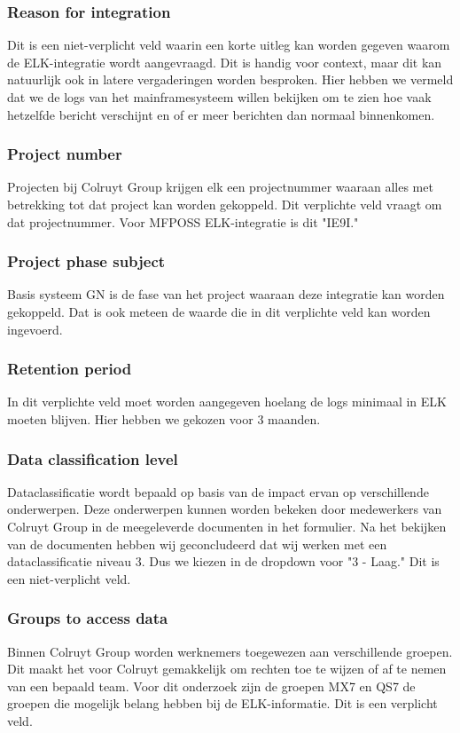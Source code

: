 \subsubsection{Reason for integration}
Dit is een niet-verplicht veld waarin een korte uitleg kan worden gegeven waarom de ELK-integratie wordt aangevraagd. Dit is handig voor context, maar dit kan natuurlijk ook in latere vergaderingen worden besproken. Hier hebben we vermeld dat we de logs van het mainframesysteem willen bekijken om te zien hoe vaak hetzelfde bericht verschijnt en of er meer berichten dan normaal binnenkomen.

\subsubsection{Project number}
Projecten bij Colruyt Group krijgen elk een projectnummer waaraan alles met betrekking tot dat project kan worden gekoppeld. Dit verplichte veld vraagt om dat projectnummer. Voor MFPOSS ELK-integratie is dit "IE9I."

\subsubsection{Project phase subject}
Basis systeem GN is de fase van het project waaraan deze integratie kan worden gekoppeld. Dat is ook meteen de waarde die in dit verplichte veld kan worden ingevoerd.

\subsubsection{Retention period}
In dit verplichte veld moet worden aangegeven hoelang de logs minimaal in ELK moeten blijven. Hier hebben we gekozen voor 3 maanden.

\subsubsection{Data classification level}
Dataclassificatie wordt bepaald op basis van de impact ervan op verschillende onderwerpen. Deze onderwerpen kunnen worden bekeken door medewerkers van Colruyt Group in de meegeleverde documenten in het formulier. Na het bekijken van de documenten hebben wij geconcludeerd dat wij werken met een dataclassificatie niveau 3. Dus we kiezen in de dropdown voor "3 - Laag." Dit is een niet-verplicht veld.

\subsubsection{Groups to access data}
Binnen Colruyt Group worden werknemers toegewezen aan verschillende groepen. Dit maakt het voor Colruyt gemakkelijk om rechten toe te wijzen of af te nemen van een bepaald team. Voor dit onderzoek zijn de groepen MX7 en QS7 de groepen die mogelijk belang hebben bij de ELK-informatie. Dit is een verplicht veld.

